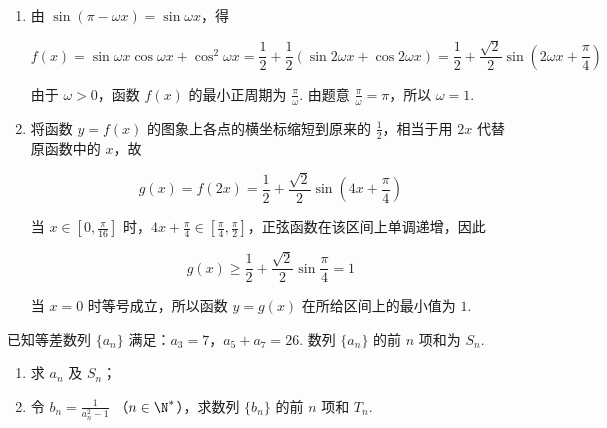 \begin{solution}
\begin{enumerate}
\item 由 \(\sin(\pi-\omega x)=\sin\omega x\)，得

\[
f(x)=\sin\omega x\cos\omega x+\cos^2\omega x=\frac{1}{2}+\frac{1}{2}\left(\sin2\omega x+\cos2\omega x\right)=\frac{1}{2}+\frac{\sqrt{2}}{2}\sin\left(2\omega x+\frac{\pi}{4}\right)
\]

由于 \(\omega>0\)，函数 \(f(x)\) 的最小正周期为 \(\frac{\pi}{\omega}\). 由题意 \(\frac{\pi}{\omega}=\pi\)，所以 \(\omega=1\).

\item 将函数 \(y=f(x)\) 的图象上各点的横坐标缩短到原来的 \(\frac{1}{2}\)，相当于用 \(2x\) 代替原函数中的 \(x\)，故

\[
g(x)=f(2x)=\frac{1}{2}+\frac{\sqrt{2}}{2}\sin\left(4x+\frac{\pi}{4}\right)
\]

当 \(x\in\left[0,\frac{\pi}{16}\right]\) 时，\(4x+\frac{\pi}{4}\in\left[\frac{\pi}{4},\frac{\pi}{2}\right]\)，正弦函数在该区间上单调递增，因此

\[
g(x)\geqslant \frac{1}{2}+\frac{\sqrt{2}}{2}\sin\frac{\pi}{4}=1
\]

当 \(x=0\) 时等号成立，所以函数 \(y=g(x)\) 在所给区间上的最小值为 \(1\).
\end{enumerate}
\end{solution}

\begin{problem}
已知等差数列 \(\{a_n\}\) 满足：\(a_3 = 7\)，\(a_5 + a_7 = 26\). 数列 \(\{a_n\}\) 的前 \(n\) 项和为 \(S_n\).

\begin{enumerate}
\item 求 \(a_n\) 及 \(S_n\)；
\item 令 \(b_n = \frac{1}{a_n^2 - 1}\) （\(n \in \N^*\)），求数列 \(\{b_n\}\) 的前 \(n\) 项和 \(T_n\).
\end{enumerate}
\end{problem}

